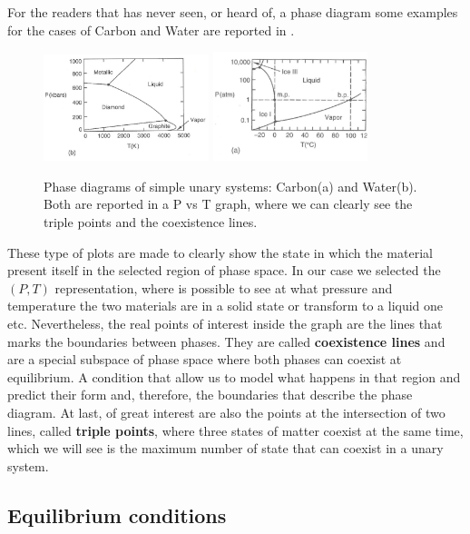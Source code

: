 For the readers that has never seen, or heard of, a phase diagram some examples for the cases of Carbon and Water are reported in .
\begin{figure}[b]
    \centering
    \includegraphics[width=0.43\textwidth]{Immagini/DiaCarb.png}
    \includegraphics[width=0.4\textwidth]{Immagini/DiagraWater.png}
    \caption{
        Phase diagrams of simple unary systems: Carbon(a) and Water(b). Both are reported in a P vs T graph, where we can clearly see the triple points and the coexistence lines. 
    }
    \label{fig:PhaseDia}
\end{figure}
These type of plots are made to clearly show the state in which the material present itself in the selected region of phase space. In our case we selected the $(P, T)$ representation, where is possible to see at what pressure and temperature the two materials are in a solid state or transform to a liquid one etc. Nevertheless, the real points of interest inside the graph are the lines that marks the boundaries between phases. They are called \textbf{coexistence lines} and are a special subspace of phase space where both phases can coexist at equilibrium. A condition that allow us to model what happens in that region and predict their form and, therefore, the boundaries that describe the phase diagram. At last, of great interest are also the points at the intersection of two lines, called \textbf{triple points}, where three states of matter coexist at the same time, which we will see is the maximum number of state that can coexist in a unary system.

\subsection{Equilibrium conditions}

